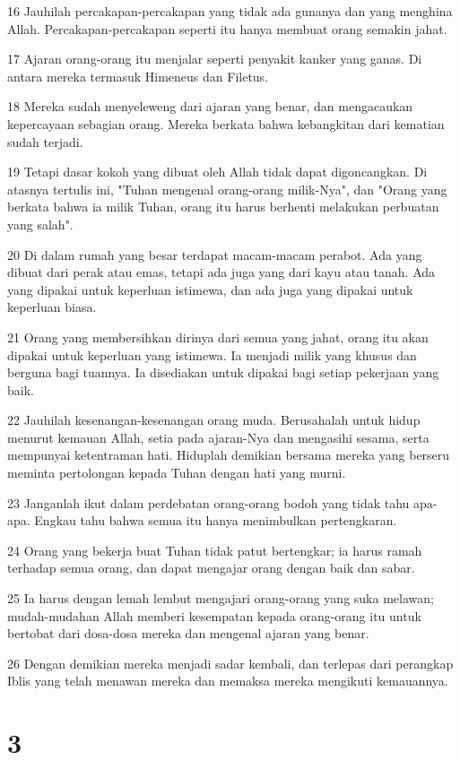 \par 16 Jauhilah percakapan-percakapan yang tidak ada gunanya dan yang menghina Allah. Percakapan-percakapan seperti itu hanya membuat orang semakin jahat.
\par 17 Ajaran orang-orang itu menjalar seperti penyakit kanker yang ganas. Di antara mereka termasuk Himeneus dan Filetus.
\par 18 Mereka sudah menyeleweng dari ajaran yang benar, dan mengacaukan kepercayaan sebagian orang. Mereka berkata bahwa kebangkitan dari kematian sudah terjadi.
\par 19 Tetapi dasar kokoh yang dibuat oleh Allah tidak dapat digoncangkan. Di atasnya tertulis ini, "Tuhan mengenal orang-orang milik-Nya", dan "Orang yang berkata bahwa ia milik Tuhan, orang itu harus berhenti melakukan perbuatan yang salah".
\par 20 Di dalam rumah yang besar terdapat macam-macam perabot. Ada yang dibuat dari perak atau emas, tetapi ada juga yang dari kayu atau tanah. Ada yang dipakai untuk keperluan istimewa, dan ada juga yang dipakai untuk keperluan biasa.
\par 21 Orang yang membersihkan dirinya dari semua yang jahat, orang itu akan dipakai untuk keperluan yang istimewa. Ia menjadi milik yang khusus dan berguna bagi tuannya. Ia disediakan untuk dipakai bagi setiap pekerjaan yang baik.
\par 22 Jauhilah kesenangan-kesenangan orang muda. Berusahalah untuk hidup menurut kemauan Allah, setia pada ajaran-Nya dan mengasihi sesama, serta mempunyai ketentraman hati. Hiduplah demikian bersama mereka yang berseru meminta pertolongan kepada Tuhan dengan hati yang murni.
\par 23 Janganlah ikut dalam perdebatan orang-orang bodoh yang tidak tahu apa-apa. Engkau tahu bahwa semua itu hanya menimbulkan pertengkaran.
\par 24 Orang yang bekerja buat Tuhan tidak patut bertengkar; ia harus ramah terhadap semua orang, dan dapat mengajar orang dengan baik dan sabar.
\par 25 Ia harus dengan lemah lembut mengajari orang-orang yang suka melawan; mudah-mudahan Allah memberi kesempatan kepada orang-orang itu untuk bertobat dari dosa-dosa mereka dan mengenal ajaran yang benar.
\par 26 Dengan demikian mereka menjadi sadar kembali, dan terlepas dari perangkap Iblis yang telah menawan mereka dan memaksa mereka mengikuti kemauannya.

\chapter{3}

